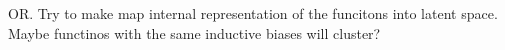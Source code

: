 \documentclass{article}
\begin{document}
OR. Try to make map internal representation of the funcitons into latent space. Maybe functinos with the same inductive biases will cluster?








\end{document}

